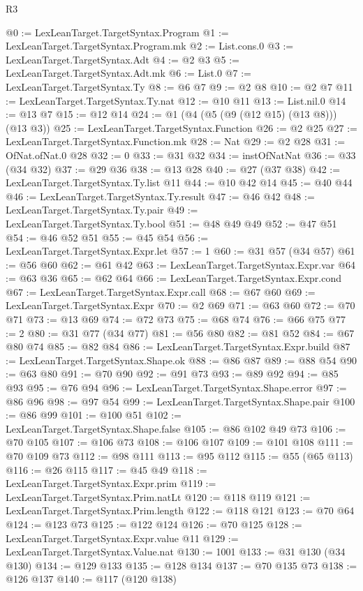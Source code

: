 \begin{lexlean}{R3}
\begin{coremodule}
@0 := LexLeanTarget.TargetSyntax.Program
@1 := LexLeanTarget.TargetSyntax.Program.mk
@2 := List.cons.{0}
@3 := LexLeanTarget.TargetSyntax.Adt
@4 := @2 @3
@5 := LexLeanTarget.TargetSyntax.Adt.mk
@6 := List.{0}
@7 := LexLeanTarget.TargetSyntax.Ty
@8 := @6 @7
@9 := @2 @8
@10 := @2 @7
@11 := LexLeanTarget.TargetSyntax.Ty.nat
@12 := @10 @11
@13 := List.nil.{0}
@14 := @13 @7
@15 := @12 @14
@24 := @1 (@4 (@5 (@9 (@12 @15) (@13 @8))) (@13 @3))
@25 := LexLeanTarget.TargetSyntax.Function
@26 := @2 @25
@27 := LexLeanTarget.TargetSyntax.Function.mk
@28 := Nat
@29 := @2 @28
@31 := OfNat.ofNat.{0} @28
@32 := 0
@33 := @31 @32
@34 := instOfNatNat
@36 := @33 (@34 @32)
@37 := @29 @36
@38 := @13 @28
@40 := @27 (@37 @38)
@42 := LexLeanTarget.TargetSyntax.Ty.list @11
@44 := @10 @42 @14
@45 := @40 @44
@46 := LexLeanTarget.TargetSyntax.Ty.result
@47 := @46 @42
@48 := LexLeanTarget.TargetSyntax.Ty.pair
@49 := LexLeanTarget.TargetSyntax.Ty.bool
@51 := @48 @49 @49
@52 := @47 @51
@54 := @46 @52 @51
@55 := @45 @54
@56 := LexLeanTarget.TargetSyntax.Expr.let
@57 := 1
@60 := @31 @57 (@34 @57)
@61 := @56 @60
@62 := @61 @42
@63 := LexLeanTarget.TargetSyntax.Expr.var
@64 := @63 @36
@65 := @62 @64
@66 := LexLeanTarget.TargetSyntax.Expr.cond
@67 := LexLeanTarget.TargetSyntax.Expr.call
@68 := @67 @60
@69 := LexLeanTarget.TargetSyntax.Expr
@70 := @2 @69
@71 := @63 @60
@72 := @70 @71
@73 := @13 @69
@74 := @72 @73
@75 := @68 @74
@76 := @66 @75
@77 := 2
@80 := @31 @77 (@34 @77)
@81 := @56 @80
@82 := @81 @52
@84 := @67 @80 @74
@85 := @82 @84
@86 := LexLeanTarget.TargetSyntax.Expr.build
@87 := LexLeanTarget.TargetSyntax.Shape.ok
@88 := @86 @87
@89 := @88 @54
@90 := @63 @80
@91 := @70 @90
@92 := @91 @73
@93 := @89 @92
@94 := @85 @93
@95 := @76 @94
@96 := LexLeanTarget.TargetSyntax.Shape.error
@97 := @86 @96
@98 := @97 @54
@99 := LexLeanTarget.TargetSyntax.Shape.pair
@100 := @86 @99
@101 := @100 @51
@102 := LexLeanTarget.TargetSyntax.Shape.false
@105 := @86 @102 @49 @73
@106 := @70 @105
@107 := @106 @73
@108 := @106 @107
@109 := @101 @108
@111 := @70 @109 @73
@112 := @98 @111
@113 := @95 @112
@115 := @55 (@65 @113)
@116 := @26 @115
@117 := @45 @49
@118 := LexLeanTarget.TargetSyntax.Expr.prim
@119 := LexLeanTarget.TargetSyntax.Prim.natLt
@120 := @118 @119
@121 := LexLeanTarget.TargetSyntax.Prim.length
@122 := @118 @121
@123 := @70 @64
@124 := @123 @73
@125 := @122 @124
@126 := @70 @125
@128 := LexLeanTarget.TargetSyntax.Expr.value @11
@129 := LexLeanTarget.TargetSyntax.Value.nat
@130 := 1001
@133 := @31 @130 (@34 @130)
@134 := @129 @133
@135 := @128 @134
@137 := @70 @135 @73
@138 := @126 @137
@140 := @117 (@120 @138)

\end{coremodule}
\end{lexlean}
